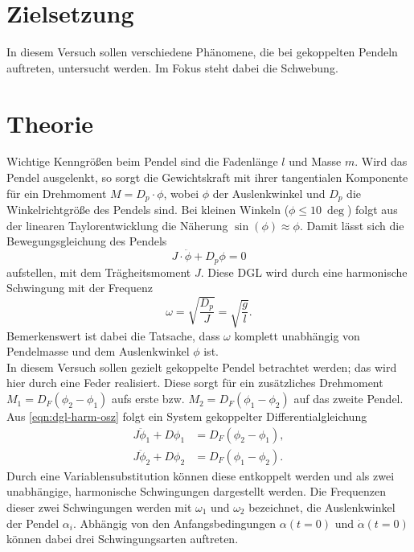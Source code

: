 \section*{Zielsetzung}
\label{sec:Zielsetzung}
In diesem Versuch sollen verschiedene Phänomene, die bei gekoppelten Pendeln auftreten,
untersucht werden. Im Fokus steht dabei die Schwebung.

\section{Theorie}
\label{sec:Theorie}
Wichtige Kenngrößen beim Pendel sind die Fadenlänge $l$ und Masse $m$. Wird das Pendel
ausgelenkt, so sorgt die Gewichtskraft mit ihrer tangentialen Komponente für ein
Drehmoment $M = D_p \cdot \phi$, wobei $\phi$ der Auslenkwinkel und $D_p$ die
Winkelrichtgröße des Pendels sind. Bei kleinen Winkeln ($\phi \leq \SI{10}{\deg}$) 
folgt aus der linearen Taylorentwicklung die Näherung $\sin(\phi) \approx \phi$.
Damit lässt sich die Bewegungsgleichung des Pendels
\begin{equation}
	J \cdot \ddot \phi + D_p \phi = 0
	\label{eqn:dgl-harm-osz}
\end{equation}
aufstellen, mit dem Trägheitsmoment $J$. Diese DGL wird durch eine harmonische Schwingung
mit der Frequenz
\begin{equation}
	\omega = \sqrt{\frac{D_p}{J}} = \sqrt{\frac{g}{l}}.
\end{equation}
Bemerkenswert ist dabei die Tatsache, dass $\omega$ komplett unabhängig von Pendelmasse
und dem Auslenkwinkel $\phi$ ist.
\\
In diesem Versuch sollen gezielt gekoppelte Pendel betrachtet werden; das wird hier durch
eine Feder realisiert. Diese sorgt für ein zusätzliches Drehmoment 
$M_1 = D_F (\phi_2 - \phi_1)$ aufs erste bzw. $M_2 = D_F (\phi_1 - \phi_2)$ auf das zweite
Pendel. Aus \autoref{eqn:dgl-harm-osz} folgt ein System gekoppelter Differentialgleichung 
\begin{align}
	J \ddot \phi_1 + D \phi_1 &= D_F (\phi_2 - \phi_1), \\
	J \ddot \phi_2 + D \phi_2 &= D_F (\phi_1 - \phi_2).
\end{align}
Durch eine Variablensubstitution können diese entkoppelt werden und als zwei unabhängige,
harmonische Schwingungen dargestellt werden. Die Frequenzen dieser zwei Schwingungen
werden mit $\omega_1$ und $\omega_2$ bezeichnet, die Auslenkwinkel der Pendel $\alpha_i$.
Abhängig von den Anfangsbedingungen $\alpha(t = 0)$ und $\dot \alpha(t = 0)$ können dabei
drei Schwingungsarten auftreten.

